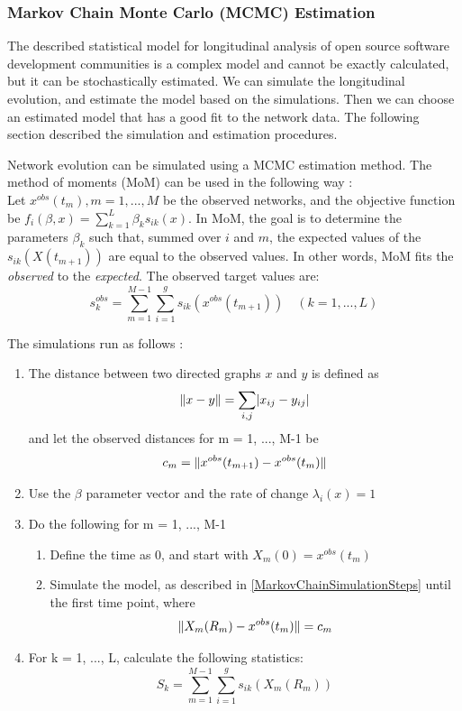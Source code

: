 \documentclass[12pt,letterpaper]{gthesis2}  %
\DeclarePairedDelimiter{\abs}{\lvert}{\rvert}
\DeclarePairedDelimiter{\norm}{\lVert}{\rVert}
\begin{document}
\subsubsection*{Markov Chain Monte Carlo (MCMC) Estimation}
\label{estimation}
The described statistical model for longitudinal analysis of open source software development communities is a complex model and cannot be exactly calculated, but it can be stochastically estimated. We can simulate the longitudinal evolution, and estimate the model based on the simulations. Then we can choose an estimated model that has a good fit to the network data.
The following section described the simulation and estimation procedures. 

Network evolution can be simulated using a MCMC estimation method. The method of moments (MoM) can be used in the following way \cite{Snijders2004}: \\

Let $x^{obs}(t_m), m = 1, ..., M$ be the observed networks, and the objective function be $f_i(\beta, x) = \sum_{k=1}^L \beta_k s_{ik}(x)$. 
In MoM, the goal is to determine the parameters $\beta_k$ such that, summed over $i$ and $m$, the expected values of the $s_{ik}(X(t_{m+1}))$ are equal to the observed values. In other words, MoM fits the \textit{observed} to the \textit{expected}. 
The observed target values are:
\begin{equation}
s_k^{obs} = \sum_{m=1}^{M-1}\sum_{i=1}^g s_{ik}(x^{obs}(t_{m+1})) \quad (k = 1, ..., L)
\end{equation}

The simulations run as follows \cite{Snijders2004}:
\begin{enumerate}
\item The distance between two directed graphs $x$ and $y$ is defined as
\begin{equation}
\norm{x -y} = \sum_{i,j}\abs{x_{ij} - y_{ij}}
\end{equation}
and let the observed distances for m = 1, ..., M-1 be 
\begin{equation}
c_m = \norm{x^{obs}(t_{m+1})-x^{obs}(t_m)}
\end{equation}
\item Use the $\beta$ parameter vector and the rate of change $\lambda_{i}(x) = 1$

\item Do the following for m = 1, ..., M-1
\begin{enumerate}
\item Define the time as 0, and start with $X_m(0) = x^{obs}(t_m)$
\item Simulate the model, as described in \ref{MarkovChainSimulationSteps} until the first time point, where 
\begin{equation}
\norm{X_m(R_m) - x^{obs}(t_m)} = c_m
\end{equation}
\end{enumerate}
\item For k = 1, ..., L, calculate the following statistics:
\begin{equation}
S_k = \sum_{m = 1}^{M-1}\sum_{i=1}^{g}s_{ik}(X_m(R_m))
\end{equation}
\end{enumerate}
\end{document}
